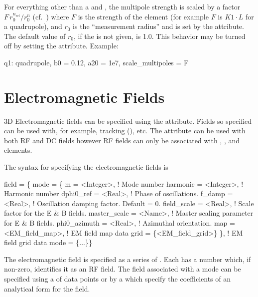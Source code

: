 For everything other than a  and , the
multipole strength is scaled by a factor $F \, r_0^{n_\text{ref}} /
r_0^n$ (cf.~) where $F$ is the strength of the element (for
example $F$ is $K1 \cdot L$ for a quadrupole), and $r_0$ is the
``measurement radius'' and is set by the  attribute. The
default value of $r_0$, if the  is not given, is 1.0.  This
behavior may be turned off by setting the 
attribute.  Example:
\begin{example}
  q1: quadrupole, b0 = 0.12, a20 = 1e7, scale_multipoles = F
\end{example}

\section{Electromagnetic Fields}
\label{s:em.fields}

3D Electromagnetic fields can be specified using the 
attribute. Fields so specified can be used with, for example,
 tracking (), etc. The 
attribute can be used with both RF and DC fields however RF fields can
only be associated with , , and 
elements.

The syntax for specifying the electromagnetic fields is
\begin{example}
  field = \{
    mode = \{
      m             = <Integer>, ! Mode number
      harmonic      = <Integer>, ! Harmonic number 
      dphi0_ref     = <Real>,    ! Phase of oscillations.
      f_damp        = <Real>,    ! Oscillation damping factor. Default = 0.
      field_scale   = <Real>,    ! Scale factor for the E & B fields.
      master_scale  = <Name>,    ! Master scaling parameter for E & B fields.
      phi0_azimuth  = <Real>,    ! Azimuthal orientation.
      map           = <EM_field_map>,        ! EM field map data
      grid          = \{<EM_field_grid>\} \},    ! EM field grid data
    mode = \{...\}\}
\end{example}
The electromagnetic field is specified as a series of . Each
 has a  number which, if non-zero, identifies it
as an RF field. The field associated with a mode can be specified
using a  of data points or by a  which specify the
coefficients of an analytical form for the field.

